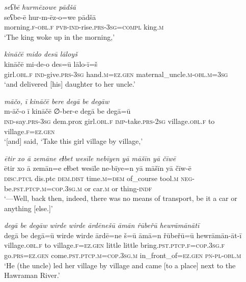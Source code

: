 \ea \label{ZP.37}
\textit{seʕbē hurmēzowe pādšā} \\ 
\gll seʕbe-ē hur-m-ēz-o=we pādšā \\ 
 morning\textsc{.f}\textsc{-obl}\textsc{.f} \textsc{pvb-}\textsc{ind-}rise\textsc{.prs}\textsc{-3sg}\textsc{=compl} king\textsc{.m} \\ 
\glt `The king woke up in the morning,'
\z 
 
\ea \label{ZP.38}
\textit{kināčē mido desū lāloyš} \\ 
\gll kināčē mi-de-o des=ū lālo-ī=š \\ 
 girl\textsc{.obl}\textsc{.f} \textsc{ind-}give\textsc{.prs}\textsc{-3sg} hand\textsc{.m}\textsc{\textsc{=ez.gen}} maternal\_uncle\textsc{.m}\textsc{-obl}\textsc{.m}\textsc{=3sg} \\ 
\glt `and delivered [his] daughter to her uncle.'
\z 
 
\ea \label{ZP.39}
\textit{māčo, ī kināčē bere degā be degāw} \\ 
\gll m-āč-o ī kināčē ∅-ber-e degā be degā=ū \\ 
 \textsc{ind-}say\textsc{.prs}\textsc{-3sg} dem.prox girl\textsc{.obl}\textsc{.f} \textsc{imp-}take\textsc{.prs}-\textsc{2sg} village\textsc{.obl}\textsc{.f} to village\textsc{.f}\textsc{\textsc{=ez.gen}} \\ 
\glt `[and] said, ‘Take this girl village by village,'
\z 
 
\ea \label{ZP.40}
\textit{ētir xo ā zemāne eɫbet wesīle nebīyen yā māšīn yā čīwē} \\ 
\gll ētir xo ā zemān=e eɫbet wesīle ne-bīye=n yā māšīn yā čīw-ē \\ 
 \textsc{disc.ptcl} dis.ptc \textsc{dem.dist} time\textsc{.m}\textsc{=dem} of\_course tool\textsc{.m} \textsc{neg-}be\textsc{.pst}\textsc{.ptcp}\textsc{.m}\textsc{=cop}\textsc{.3sg}\textsc{.m} or car\textsc{.m} or thing\textsc{-indf} \\ 
\glt `—Well, back then, indeed, there was no means of transport, be it a car or anything [else.]'
\z 
 
\ea \label{ZP.41}
\textit{degā be degāw wirde wirde ārdēnešū āmān řūbeřū hewrāmānātī} \\ 
\gll degā be degā=ū wirde wirde ārdē=ne š=ū āmā=n řūbeřū=ū hewrāmān-āt-ī \\ 
 village\textsc{.obl}\textsc{.f} to village\textsc{.f}\textsc{\textsc{=ez.gen}} little little bring\textsc{.pst}\textsc{.ptcp}\textsc{.f}\textsc{=cop}\textsc{.3sg}\textsc{.f} go\textsc{.prs}\textsc{\textsc{=ez.gen}} come\textsc{.pst}\textsc{.ptcp}\textsc{.m}\textsc{=cop}\textsc{.3sg}\textsc{.m} in\_front\_of\textsc{\textsc{=ez.gen}} \textsc{pn}\textsc{\textsc{-pl}}\textsc{-obl}\textsc{.m} \\ 
\glt `He (the uncle) led her village by village and came [to a place] next to the Hawraman River.'
\z 
 
